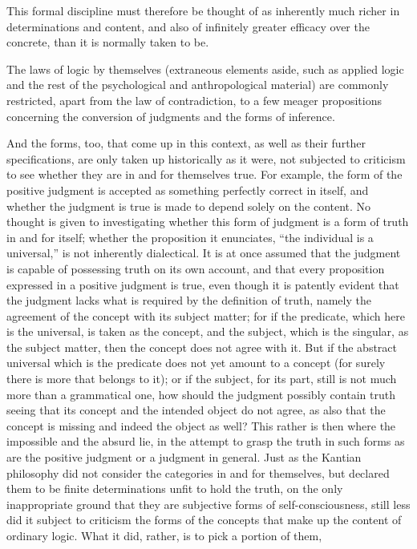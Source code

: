 This formal discipline must therefore be thought of
as inherently much richer in determinations and content,
and also of infinitely greater efficacy over the concrete,
than it is normally taken to be.

The laws of logic by themselves
(extraneous elements aside, such as applied logic
and the rest of the psychological and anthropological material)
are commonly restricted, apart from the law of contradiction,
to a few meager propositions concerning 
the conversion of judgments and the forms of inference.

And the forms, too, that come up in this context,
as well as their further specifications,
are only taken up historically as it were,
not subjected to criticism to see whether
they are in and for themselves true.
For example, the form of the positive judgment
is accepted as something perfectly correct in itself,
and whether the judgment is true is made
to depend solely on the content.
No thought is given to investigating
whether this form of judgment is
a form of truth in and for itself;
whether the proposition it enunciates,
“the individual is a universal,”
is not inherently dialectical.
It is at once assumed that
the judgment is capable of possessing
truth on its own account,
 and that every proposition expressed in a positive
judgment is true,
even though it is patently evident that the judgment lacks
what is required by the definition of truth,
 namely the agreement of the concept with its subject matter;
for if the predicate, which here is the universal,
is taken as the concept,
and the subject, which is the singular,
as the subject matter,
then the concept does not agree with it.
But if the abstract universal which is the predicate
does not yet amount to a concept
(for surely there is more that belongs to it);
or if the subject, for its part,
still is not much more than a grammatical one,
how should the judgment
possibly contain truth seeing that its concept and the intended object do
not agree, as also that the concept is missing and indeed the object as well?
This rather is then where the impossible and the absurd lie,
in the attempt to grasp the truth in such forms as are
the positive judgment or a judgment in general.
Just as the Kantian philosophy did not consider
the categories in and for themselves,
but declared them to be finite determinations unfit
to hold the truth, on the only inappropriate ground
that they are subjective forms of self-consciousness,
still less did it subject to criticism
the forms of the concepts that make up
the content of ordinary logic.
What it did, rather, is to pick a portion of them,
